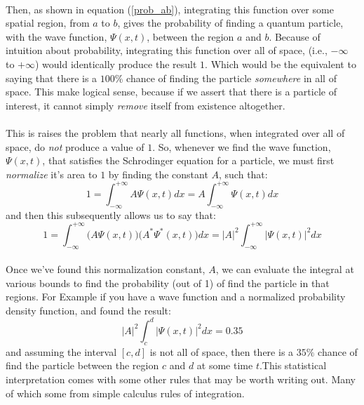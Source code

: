 \documentclass[12pt,letterpaper]{book}
\begin{document}
\paragraph*{}Then, as shown in equation (\ref{prob_ab}), integrating this function over some spatial region, from $a$ to $b$, gives the probability of finding a quantum particle, with the wave function, $\Psi(x,t)$, between the region $a$ and $b$. Because of intuition about probability, integrating this function over all of space, (i.e., $-\infty$ to $+\infty$) would identically produce the result $1$. Which would be the equivalent to saying that there is a $100\%$ chance of finding the particle \textit{somewhere} in all of space. This make logical sense, because if we assert that there is a particle of interest, it cannot simply \textit{remove} itself from existence altogether.
\paragraph*{}This is raises the problem that nearly all functions, when integrated over all of space, do \textit{not} produce a value of $1$. So, whenever we find the wave function, $\Psi(x,t)$, that satisfies the Schrodinger equation for a particle, we must first \textit{normalize} it's area to $1$ by finding the constant $A$, such that:
\begin{equation}
\label{normalize wave function}
1 = \int_{-\infty}^{+\infty} A \Psi(x,t) dx = A\int_{-\infty}^{+\infty} \Psi(x,t) dx
\end{equation}
and then this subsequently allows us to say that:
\begin{equation}
1 = \int_{-\infty}^{+\infty} \Big(A \Psi(x,t)\Big) \Big(A^* \Psi^*(x,t)\Big) dx = 
|A|^2 \int_{-\infty}^{+\infty} \Big| \Psi(x,t) \Big|^2 dx
\end{equation}
\paragraph*{}Once we've found this normalization constant, $A$, we can evaluate the integral at various bounds to find the probability (out of 1) of find the particle in that regions. For Example if you have a wave function and a normalized probability density function, and found the result:
\begin{equation}
|A|^2\int_{c}^{d} \big | \Psi(x,t) \big|^2 dx = 0.35
\end{equation}
and assuming the interval $[c,d]$ is not all of space, then there is a $35\%$ chance of find the particle between the region $c$ and $d$ at some time $t$.This statistical interpretation comes with some other rules that may be worth writing out. Many of which some from simple calculus rules of integration.
\end{document}
